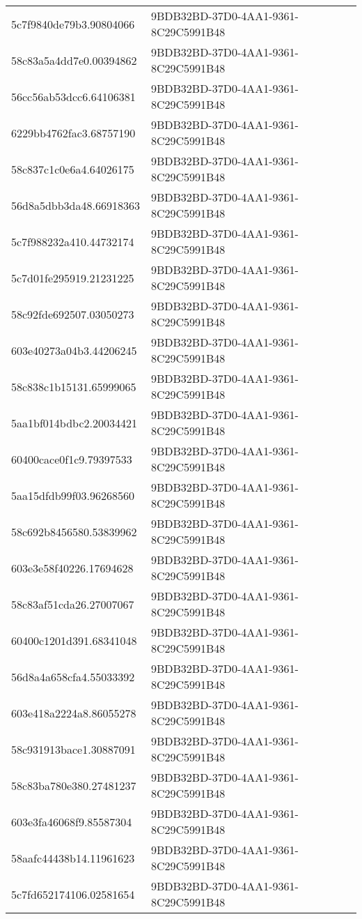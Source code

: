 \begin{tabular}{ll}
5c7f9840de79b3.90804066 & 9BDB32BD-37D0-4AA1-9361-8C29C5991B48 \\
58c83a5a4dd7e0.00394862 & 9BDB32BD-37D0-4AA1-9361-8C29C5991B48 \\
56cc56ab53dcc6.64106381 & 9BDB32BD-37D0-4AA1-9361-8C29C5991B48 \\
6229bb4762fac3.68757190 & 9BDB32BD-37D0-4AA1-9361-8C29C5991B48 \\
58c837c1c0e6a4.64026175 & 9BDB32BD-37D0-4AA1-9361-8C29C5991B48 \\
56d8a5dbb3da48.66918363 & 9BDB32BD-37D0-4AA1-9361-8C29C5991B48 \\
5c7f988232a410.44732174 & 9BDB32BD-37D0-4AA1-9361-8C29C5991B48 \\
5c7d01fe295919.21231225 & 9BDB32BD-37D0-4AA1-9361-8C29C5991B48 \\
58c92fde692507.03050273 & 9BDB32BD-37D0-4AA1-9361-8C29C5991B48 \\
603e40273a04b3.44206245 & 9BDB32BD-37D0-4AA1-9361-8C29C5991B48 \\
58c838c1b15131.65999065 & 9BDB32BD-37D0-4AA1-9361-8C29C5991B48 \\
5aa1bf014bdbc2.20034421 & 9BDB32BD-37D0-4AA1-9361-8C29C5991B48 \\
60400cace0f1c9.79397533 & 9BDB32BD-37D0-4AA1-9361-8C29C5991B48 \\
5aa15dfdb99f03.96268560 & 9BDB32BD-37D0-4AA1-9361-8C29C5991B48 \\
58c692b8456580.53839962 & 9BDB32BD-37D0-4AA1-9361-8C29C5991B48 \\
603e3e58f40226.17694628 & 9BDB32BD-37D0-4AA1-9361-8C29C5991B48 \\
58c83af51cda26.27007067 & 9BDB32BD-37D0-4AA1-9361-8C29C5991B48 \\
60400c1201d391.68341048 & 9BDB32BD-37D0-4AA1-9361-8C29C5991B48 \\
56d8a4a658cfa4.55033392 & 9BDB32BD-37D0-4AA1-9361-8C29C5991B48 \\
603e418a2224a8.86055278 & 9BDB32BD-37D0-4AA1-9361-8C29C5991B48 \\
58c931913bace1.30887091 & 9BDB32BD-37D0-4AA1-9361-8C29C5991B48 \\
58c83ba780e380.27481237 & 9BDB32BD-37D0-4AA1-9361-8C29C5991B48 \\
603e3fa46068f9.85587304 & 9BDB32BD-37D0-4AA1-9361-8C29C5991B48 \\
58aafc44438b14.11961623 & 9BDB32BD-37D0-4AA1-9361-8C29C5991B48 \\
5c7fd652174106.02581654 & 9BDB32BD-37D0-4AA1-9361-8C29C5991B48 \\

\end{tabular}
